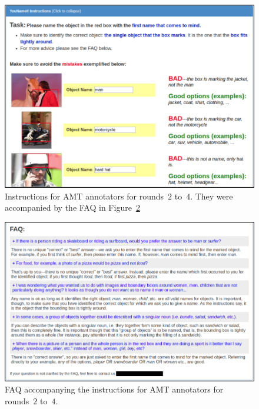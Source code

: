 \documentclass[11pt,a4paper]{article}
\begin{document}
\begin{figure}[htp]
  \centering
  \includegraphics[width=1.5\columnwidth]{figures/round1+_p1.png}
  \caption{Instructions for AMT annotators for rounds~$2$ to~$4$. They were accompanied by the FAQ in Figure~\ref{fig:faq}}
  \label{fig:instructions2}
\end{figure}
%
\begin{figure}[htp]
  \centering
  \includegraphics[width=1.5\columnwidth]{figures/round1+_p2.png}
  \caption{FAQ accompanying the instructions for AMT annotators for rounds~$2$ to~$4$.}
  \label{fig:faq}
\end{figure}
\end{document}
